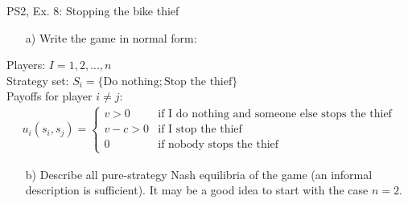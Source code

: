 \begin{frame}{PS2, Ex. 8: Stopping the bike thief}
    \begin{itemize}
      \item[a)] Write the game in normal form:
    \end{itemize}
    Players: $I={1, 2, ..., n}$\\
    Strategy set: $S_i = \{\text{Do nothing}; \text{Stop the thief}\}$\\
    Payoffs for player $i\neq j$: \begin{align*}
      u_i(s_i,s_j)=
      \left\{ \begin{array}{rl}
      v > 0 & \mbox{if I do nothing and someone else stops the thief} \\
      v-c>0 & \mbox{if I stop the thief} \\
      0     & \mbox{if nobody stops the thief}
      \end{array}\right. \end{align*}
    \begin{itemize}
      \item[b)] Describe all pure-strategy Nash equilibria of the game (an informal description is sufficient). It may be a good idea to start with the case $n = 2$.
    \end{itemize}
\end{frame}
